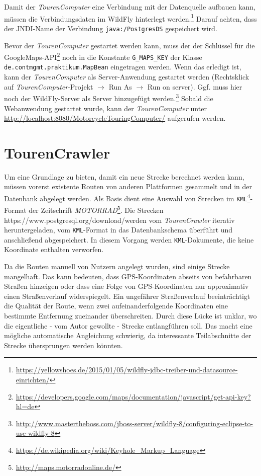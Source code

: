 \documentclass[a4paper,11pt,utf8]{scrartcl}
\begin{document}
Damit der \textit{TourenComputer} eine Verbindung mit der Datenquelle aufbauen kann, müssen die Verbindungsdaten im WildFly hinterlegt werden.\footnote{\url{https://yellowshoes.de/2015/01/05/wildfly-jdbc-treiber-und-datasource-einrichten/}} Darauf achten, dass der JNDI-Name der Verbindung \texttt{java:/PostgresDS} gespeichert wird.

Bevor der \textit{TourenComputer} gestartet werden kann, muss der der Schlüssel für die GoogleMaps-API\footnote{\url{https://developers.google.com/maps/documentation/javascript/get-api-key?hl=de}} noch in die Konstante \texttt{G\_MAPS\_KEY} der Klasse \texttt{de.contmgmt.praktikum.MapBean} eingetragen werden. Wenn das erledigt ist, kann der \textit{TourenComputer} als Server-Anwendung gestartet werden (Rechtsklick auf \textit{TourenComputer}-Projekt $\rightarrow$ Run As $\rightarrow$ Run on server). Ggf. muss hier noch der WildFly-Server als Server hinzugefügt werden.\footnote{\url{http://www.mastertheboss.com/jboss-server/wildfly-8/configuring-eclipse-to-use-wildfly-8}} Sobald die Webanwendung gestartet wurde, kann der \textit{TourenComputer} unter \url{http://localhost:8080/MotorcycleTouringComputer/} aufgerufen werden.
 
\section{TourenCrawler}
Um eine Grundlage zu bieten, damit ein neue Strecke berechnet werden kann, müssen vorerst existente Routen von anderen Plattformen gesammelt und in der Datenbank abgelegt werden. Als Basis dient eine Auswahl von Strecken im \texttt{KML}\footnote{\url{https://de.wikipedia.org/wiki/Keyhole_Markup_Language}}-Format der Zeitschrift \textit{MOTORRAD}\footnote{\url{http://maps.motorradonline.de/}}. Die Strecken https://www.postgresql.org/download/werden vom \textit{TourenCrawler} iterativ heruntergeladen, vom \texttt{KML}-Format in das Datenbankschema überführt und anschließend abgespeichert. In diesem Vorgang werden \texttt{KML}-Dokumente, die keine Koordinate enthalten verworfen.

Da die Routen manuell von Nutzern angelegt wurden, sind einige Strecke mangelhaft. Das kann bedeuten, dass GPS-Koordinaten abseits von befahrbaren Straßen hinzeigen oder dass eine Folge von GPS-Koordinaten nur approximativ einen Straßenverlauf widerspiegelt. Ein ungefährer Straßenverlauf beeinträchtigt die Qualität der Route, wenn zwei aufeinanderfolgende Koordinaten eine bestimmte Entfernung zueinander überschreiten. Durch diese \glqq Lücke\grqq{} ist unklar, wo die eigentliche - vom Autor gewollte - Strecke entlangführen soll. Das macht eine mögliche automatische Angleichung schwierig, da interessante Teilabschnitte der Strecke übersprungen werden könnten. 
\end{document}
